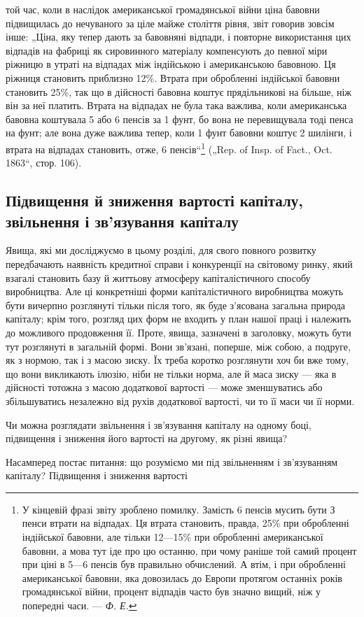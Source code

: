\parcont{}  %
той час, коли в наслідок американської громадянської війни ціна
бавовни підвищилась до нечуваного за ціле майже століття
рівня, звіт говорив зовсім інше: „Ціна, яку тепер дають за бавовняні
відпади, і повторне використання цих відпадів на
фабриці як сировинного матеріалу компенсують до певної міри
ріжницю в утраті на відпадах між індійською і американською
бавовною. Ця ріжниця становить приблизно 12\%. Втрата при
обробленні індійської бавовни становить 25\%, так що в дійсності
бавовна коштує прядільникові на  більше, ніж він за неї
платить. Втрата на відпадах не була така важлива, коли американська
бавовна коштувала 5 або 6 пенсів за 1 фунт, бо вона
не перевищувала тоді  пенса на фунт; але вона дуже важлива
тепер, коли 1 фунт бавовни коштує 2 шилінги, і втрата на відпадах
становить, отже, 6 пенсів“\footnote{
У кінцевій фразі звіту зроблено помилку. Замість 6 пенсів мусить бути З
пенси втрати на відпадах. Ця втрата становить, правда, 25\% при обробленні
індійської бавовни, але тільки 12—15\% при обробленні американської бавовни,
а мова тут іде про цю останню, при чому раніше той самий процент при
ціні в 5—6 пенсів був правильно обчислений. А втім, і при обробленні американської
бавовни, яка довозилась до Европи протягом останніх років громадянської
війни, процент відпадів часто був значно вищий, ніж у попередні
часи. — \emph{Ф. Е.}
} („Rep. of Insp. of Fact., Oct.
1863“, стор. 106).

\subsection{Підвищення й зниження вартості капіталу, звільнення
і зв’язування капіталу}

Явища, які ми досліджуємо в цьому розділі, для свого повного
розвитку передбачають наявність кредитної справи і конкуренції
на світовому ринку, який взагалі становить базу й життьову атмосферу
капіталістичного способу виробництва. Але ці конкретніші
форми капіталістичного виробництва можуть бути вичерпно розглянуті
тільки після того, як буде з’ясована загальна природа
капіталу; крім того, розгляд цих форм не входить у план нашої
праці і належить до можливого продовження її. Проте, явища,
зазначені в заголовку, можуть бути тут розглянуті в загальній
формі. Вони зв’язані, поперше, між собою, а подруге, як
з нормою, так і з масою зиску. Їх треба коротко розглянути
хоч би вже тому, що вони викликають ілюзію, ніби не тільки
норма, але й маса зиску — яка в дійсності тотожна з масою
додаткової вартості — може зменшуватись або збільшуватись
незалежно від рухів додаткової вартості, чи то її маси чи її
норми.

Чи можна розглядати звільнення і зв’язування капіталу на
одному боці, підвищення і зниження його вартості на другому,
як різні явища?

Насамперед постає питання: що розуміємо ми під звільненням
і зв’язуванням капіталу? Підвищення і зниження вартості
\parbreak{}  %
